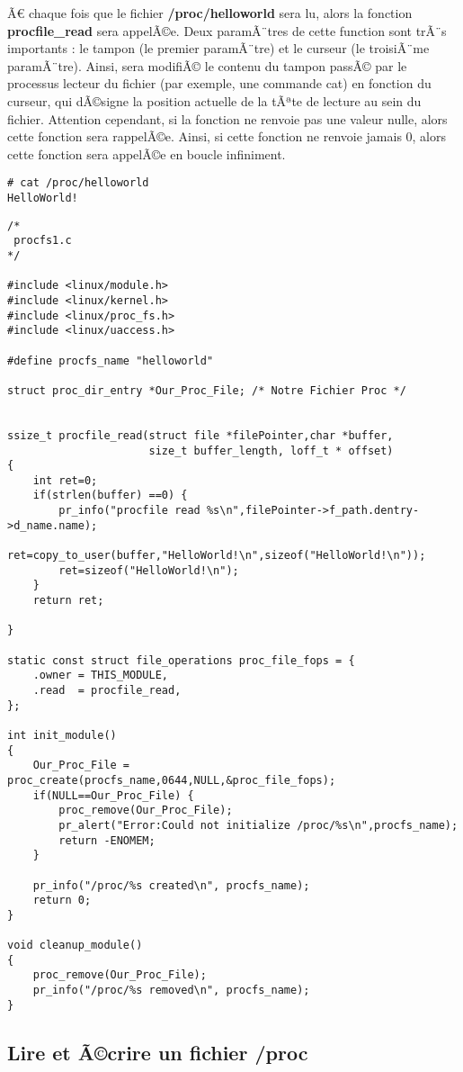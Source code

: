 \documentclass[11pt]{article}
\begin{document}
Ã€ chaque fois que le fichier \textbf{/proc/helloworld} sera lu, alors la fonction \textbf{procfile\_read} sera appelÃ©e. Deux paramÃ¨tres de cette function sont trÃ¨s importants : le tampon (le premier paramÃ¨tre) et le curseur (le troisiÃ¨me paramÃ¨tre). Ainsi, sera modifiÃ© le contenu du tampon passÃ© par le processus lecteur du fichier (par exemple, une commande cat) en fonction du curseur, qui dÃ©signe la position actuelle de la tÃªte de lecture au sein du fichier. Attention cependant, si la fonction ne renvoie pas une valeur nulle, alors cette fonction sera rappelÃ©e. Ainsi, si cette fonction ne renvoie jamais 0, alors cette fonction sera appelÃ©e en boucle infiniment.

\begin{verbatim}
# cat /proc/helloworld
HelloWorld!
\end{verbatim}

\begin{verbatim}
/*
 procfs1.c
*/

#include <linux/module.h>
#include <linux/kernel.h>
#include <linux/proc_fs.h>
#include <linux/uaccess.h>

#define procfs_name "helloworld"

struct proc_dir_entry *Our_Proc_File; /* Notre Fichier Proc */


ssize_t procfile_read(struct file *filePointer,char *buffer,
                      size_t buffer_length, loff_t * offset)
{
    int ret=0;
    if(strlen(buffer) ==0) {
        pr_info("procfile read %s\n",filePointer->f_path.dentry->d_name.name);
        ret=copy_to_user(buffer,"HelloWorld!\n",sizeof("HelloWorld!\n"));
        ret=sizeof("HelloWorld!\n");
    }
    return ret;

}

static const struct file_operations proc_file_fops = {
    .owner = THIS_MODULE,
    .read  = procfile_read,
};

int init_module()
{
    Our_Proc_File = proc_create(procfs_name,0644,NULL,&proc_file_fops);
    if(NULL==Our_Proc_File) {
        proc_remove(Our_Proc_File);
        pr_alert("Error:Could not initialize /proc/%s\n",procfs_name);
        return -ENOMEM;
    }

    pr_info("/proc/%s created\n", procfs_name);
    return 0;
}

void cleanup_module()
{
    proc_remove(Our_Proc_File);
    pr_info("/proc/%s removed\n", procfs_name);
}
\end{verbatim}

\subsection*{Lire et Ã©crire un fichier /proc}
\label{sec-7-1}
\end{document}
